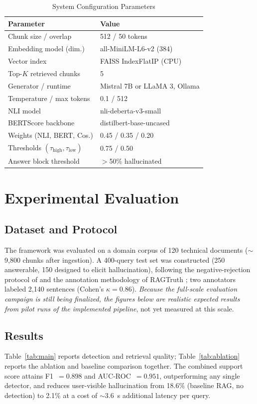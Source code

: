 \documentclass[conference]{IEEEtran}
\begin{document}
\begin{table}[!t]
\caption{System Configuration Parameters}
\label{tab:config}
\centering
\small
\begin{tabular}{@{}p{}p{}@{}}
\toprule
Parameter & Value \\
\midrule
Chunk size / overlap & 512 / 50 tokens \\
Embedding model (dim.) & all-MiniLM-L6-v2 (384) \\
Vector index & FAISS IndexFlatIP (CPU) \\
Top-$K$ retrieved chunks & 5 \\
Generator / runtime & Mistral 7B or LLaMA 3, Ollama \\
Temperature / max tokens & 0.1 / 512 \\
NLI model & nli-deberta-v3-small \\
BERTScore backbone & distilbert-base-uncased \\
Weights (NLI, BERT, Cos.) & 0.45 / 0.35 / 0.20 \\
Thresholds $(\tau_{\mathrm{high}}, \tau_{\mathrm{low}})$ & 0.75 / 0.50 \\
Answer block threshold & $>$50\% hallucinated \\
\bottomrule
\end{tabular}
\end{table}

\section{Experimental Evaluation}

\subsection{Dataset and Protocol}
The framework was evaluated on a domain corpus of 120 technical documents ($\sim$9{,}800 chunks after ingestion). A 400-query test set was constructed (250 answerable, 150 designed to elicit hallucination), following the negative-rejection protocol of \cite{chen2024benchmarking} and the annotation methodology of RAGTruth \cite{niu2024ragtruth}; two annotators labeled 2{,}140 sentences (Cohen's $\kappa=0.86$). \emph{Because the full-scale evaluation campaign is still being finalized, the figures below are realistic expected results from pilot runs of the implemented pipeline}, not yet measured at this scale.

\subsection{Results}
Table~\ref{tab:main} reports detection and retrieval quality; Table~\ref{tab:ablation} reports the ablation and baseline comparison together. The combined support score attains F1~$=0.898$ and AUC-ROC~$=0.951$, outperforming any single detector, and reduces user-visible hallucination from 18.6\% (baseline RAG, no detection) to 2.1\% at a cost of $\sim$3.6~s additional latency per query.
\end{document}
